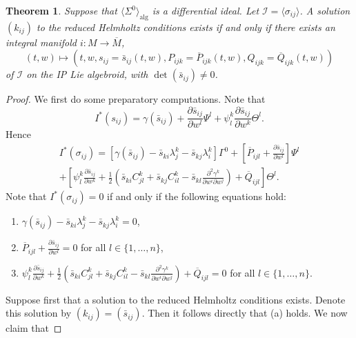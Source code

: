 \documentclass[10pt,a4paper]{amsart}
\newtheorem{theorem}{Theorem}
\begin{document}
\begin{theorem}\label{thm:helmholtzintmfd}
  Suppose that $\langle \Sigma^0\rangle_{\mathrm{alg}}$ is a differential ideal. Let $\mathcal{I}=\langle \sigma_{ij}\rangle$. A solution $(k_{ij})$ to the reduced Helmholtz conditions exists if and only if there exists an integral manifold $i\colon M\to \overline{M}$,
\begin{equation*}
    (t,w)\longmapsto \left(t,w,s_{ij}=\bar{s}_{ij}(t,w),P_{ijk}=\overline{P}_{ijk}(t,w),Q_{ijk}=\overline{Q}_{ijk}(t,w)\right)
\end{equation*}
of $\mathcal{I}$ on  the IP Lie algebroid, with $\det(\bar{s}_{ij})\neq 0$.
\end{theorem}

\begin{proof}
We first do some preparatory computations. Note that
\begin{equation*}
    I^{\ast}(s_{ij})=\gamma(\bar{s}_{ij})+\frac{\partial \bar{s}_{ij}}{\partial w^l}\Psi^l+\psi_l^k \frac{\partial \bar{s}_{ij}}{\partial w^k}\Theta^l.
\end{equation*}
Hence
\begin{multline*}
    I^{\ast}(\sigma_{ij})=\left[\gamma(\bar{s}_{ij})-\bar{s}_{ki}\lambda_j^k-\bar{s}_{kj}\lambda_i^k\right]\Gamma^0+\left[\overline{P}_{ijl}+\frac{\partial \bar{s}_{ij}}{\partial w^l}\right]\Psi^l\\+\left[\psi_l^k \frac{\partial \bar{s}_{ij}}{\partial w^k}+\frac{1}{2}\left(\bar{s}_{ki}C_{jl}^k+\bar{s}_{kj}C_{il}^k-\bar{s}_{kl}\frac{\partial^2 \gamma^k}{\partial w^i \partial w^j}\right)+\overline{Q}_{ijl}\right]\Theta^l.
\end{multline*}
Note that $I^{\ast}(\sigma_{ij})=0$  if and only if the following equations hold:
\begin{enumerate}[label=(\alph*)]
    \item $\gamma(\bar{s}_{ij})-\bar{s}_{ki}\lambda_j^k-\bar{s}_{kj}\lambda_i^k=0$,
    \item $\overline{P}_{ijl}+\frac{\partial \bar{s}_{ij}}{\partial w^l}=0$ for all $l\in \{1,\dots,n\}$,
    \item $\psi_l^k \frac{\partial \bar{s}_{ij}}{\partial w^k}+\frac{1}{2}\left(\bar{s}_{ki}C_{jl}^k+\bar{s}_{kj}C_{il}^k-\bar{s}_{kl}\frac{\partial^2 \gamma^k}{\partial w^i \partial w^j}\right)+\overline{Q}_{ijl}=0$ for all $l\in \{1,\dots,n\}$.
\end{enumerate}
Suppose first that a solution to the reduced Helmholtz conditions exists. Denote this solution by $(k_{ij})=(\bar{s}_{ij})$. Then it follows directly that (a) holds. We now claim that

\end{proof}
\end{document}
